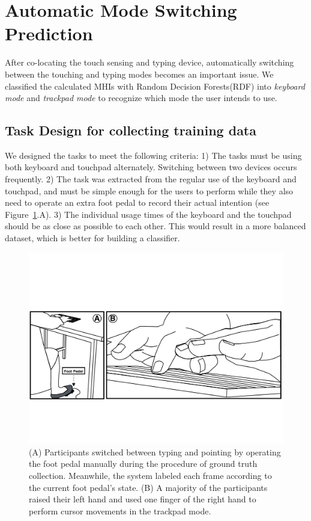 \section{Automatic Mode Switching Prediction}
After co-locating the touch sensing and typing device, automatically switching between the touching and typing modes becomes an important issue. We classified the calculated MHIs with Random Decision Forests(RDF) into \emph{keyboard mode} and \emph{trackpad mode} to recognize which mode the user intends to use.
\subsection{Task Design for collecting training data}
We designed the tasks to meet the following criteria: 1) The tasks must be using both keyboard and touchpad alternately. Switching between two devices occurs frequently. 2) The task was extracted from the regular use of the keyboard and touchpad, and must be simple enough for the users to perform while they also need to operate an extra foot pedal to record their actual intention (see Figure~\ref{fig:pedal}.A). 3) The individual usage times of the keyboard and the touchpad should be as close as possible to each other. This would result in a more balanced dataset, which is better for building a classifier.
\begin{figure}[!b]
\centering
\includegraphics[width=1\columnwidth]{figures/MERGE.pdf}
\caption{(A) Participants switched between typing and pointing by operating the foot pedal manually during the procedure of ground truth collection. Meanwhile, the system labeled each frame according to the current foot pedal's state. (B) A majority of the participants raised their left hand and used one finger of the right hand to perform cursor movements in the trackpad mode.}
\label{fig:pedal}
\end{figure}
